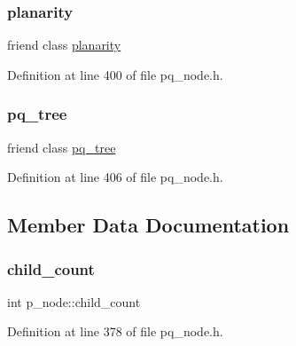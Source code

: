 \subsubsection{\texorpdfstring{planarity}{planarity}}
{\footnotesize\ttfamily friend class \mbox{\hyperlink{classplanarity}{planarity}}\hspace{0.3cm}{\ttfamily [friend]}}



Definition at line 400 of file pq\+\_\+node.\+h.

\mbox{\label{classp__node_a0a5be4bb438c891059fae98f607f2a9c}} 
\subsubsection{\texorpdfstring{pq\+\_\+tree}{pq\_tree}}
{\footnotesize\ttfamily friend class \mbox{\hyperlink{classpq__tree}{pq\+\_\+tree}}\hspace{0.3cm}{\ttfamily [friend]}}



Definition at line 406 of file pq\+\_\+node.\+h.



\subsection{Member Data Documentation}
\mbox{\label{classp__node_a74d5be4f6767bda5b5803dc2f0987b74}} 
\subsubsection{\texorpdfstring{child\+\_\+count}{child\_count}}
{\footnotesize\ttfamily int p\+\_\+node\+::child\+\_\+count\hspace{0.3cm}{\ttfamily [private]}}



Definition at line 378 of file pq\+\_\+node.\+h.

\mbox{\label{classpq__node_a3e7c886498c76c633f057fb42ff9c435}} 
